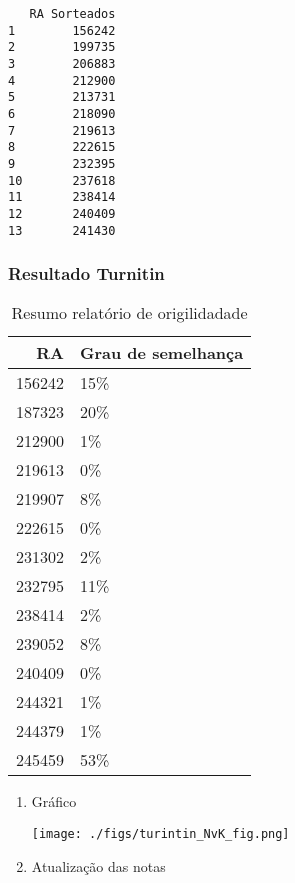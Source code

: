 \documentclass[11pt]{article}
\begin{document}
\begin{verbatim}
   RA Sorteados
1        156242
2        199735
3        206883
4        212900
5        213731
6        218090
7        219613
8        222615
9        232395
10       237618
11       238414
12       240409
13       241430
\end{verbatim}

\subsubsection{Resultado Turnitin}
\label{sec:org9991caa}

\begin{table}[htbp]
\caption{\label{TurnitinNvK}Resumo relatório de origilidadade}
\centering
\begin{tabular}{rl}
\hline
RA & Grau de semelhança\\
\hline
156242 & 15\%\\
187323 & 20\%\\
212900 & 1\%\\
219613 & 0\%\\
219907 & 8\%\\
222615 & 0\%\\
231302 & 2\%\\
232795 & 11\%\\
238414 & 2\%\\
239052 & 8\%\\
240409 & 0\%\\
244321 & 1\%\\
244379 & 1\%\\
245459 & 53\%\\
\hline
\end{tabular}
\end{table}

\begin{enumerate}
\item Gráfico
\label{sec:org42437ec}
\begin{center}
\texttt{[image: ./figs/turintin\_NvK\_fig.png]}
\end{center}

\item Atualização das notas
\label{sec:org66a7bce}
\end{enumerate}
\end{document}

